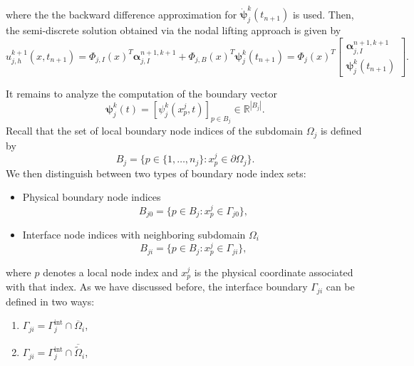 \documentclass[a4paper, 11pt]{article}
\theoremstyle{remark}
\begin{document}
\begin{enumerate}[label = (\arabic*)]
\begin{align*}
\end{align*}
where the the backward difference approximation for $\boldsymbol{\dot{\psi}}_{j}^{k}(t_{n+1})$ is used. Then, the semi-discrete solution obtained via the nodal lifting approach is given by
\begin{equation*}
    u^{k+1}_{j, h}(x, t_{n+1}) = \Phi_{j, I}(x)^{T}\boldsymbol{\alpha}_{j, I}^{n+1, k+1} + \Phi_{j, B}(x)^{T}\boldsymbol{\psi}_{j}^{k}(t_{n+1}) = \Phi_{j}(x)^{T}
    \begin{bmatrix}
        \boldsymbol{\alpha}_{j, I}^{n+1, k+1}\\
        \boldsymbol{\psi}_{j}^{k}(t_{n+1})
    \end{bmatrix}.
\end{equation*}
\end{enumerate}
It remains to analyze the computation of the boundary vector
\begin{equation*}
    \boldsymbol{\psi}_{j}^{k}(t) = [\psi_{j}^{k}(x^{j}_{p}, t)]_{p\in B_{j}}\in\mathbb{R}^{|B_{j}|}.
\end{equation*}
Recall that the set of local boundary node indices of the subdomain $\Omega_{j}$ is defined by
\begin{equation*}
    B_{j} = \{p\in \{1, \ldots, n_{j}\} : x_{p}^{j}\in\partial\Omega_j\}.
\end{equation*}
We then distinguish between two types of boundary node index sets:
\begin{itemize}
    \item [--] Physical boundary node indices
    \begin{equation*}
        B_{j0} = \{p\in B_{j}: x^{j}_{p}\in \Gamma_{j0}\},
    \end{equation*}
    \item [--] Interface node indices with neighboring subdomain $\Omega_{i}$
    \begin{equation*}
        B_{ji} = \{p\in B_{j}: x^{j}_{p}\in \Gamma_{ji}\},
    \end{equation*}
\end{itemize}
where $p$ denotes a local node index and $x^{j}_p$ is the physical coordinate associated with that index. As we have discussed before, 
the interface boundary $\Gamma_{ji}$ can be defined in two ways:
\begin{enumerate}[label=(\arabic*)]
    \item $\Gamma_{ji} = \Gamma_{j}^{\text{int}} \cap \overline{\Omega}_i$,
    \item $\Gamma_{ji} = \Gamma_{j}^{\text{int}} \cap \overline{\widetilde{\Omega}}_i$,
\end{enumerate} 
\end{document}

